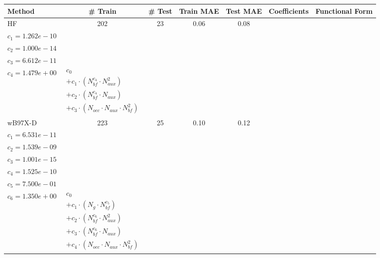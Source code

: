 \small
\setlength{\tabcolsep}{3pt}
\begin{longtable}{|l|c|c|c|c|p{3.2cm}|p{5.0cm}|}
\hline
\textbf{Method} & \textbf{\# Train} & \textbf{\# Test} & \textbf{Train MAE} & \textbf{Test MAE} & \textbf{Coefficients} & \textbf{Functional Form} \\ 
\hline
\endhead
HF & 202 & 23 & 0.06 & 0.08 & \begin{tabular}{l}\(c_{0}=3.037e+00\) \\ \(c_{1}=1.262e-10\) \\ \(c_{2}=1.000e-14\) \\ \(c_{3}=6.612e-11\) \\ \(c_{4}=1.479e+00\)\end{tabular} & $\begin{array}{l}c_{0} \\ + c_{1}  \cdot  (N_{bf} ^{c_{4}}  \cdot  N_{aux} ^{2}) \\ + c_{2}  \cdot  (N_{bf} ^{c_{4}}  \cdot  N_{aux}) \\ + c_{3}  \cdot  (N_{occ}  \cdot  N_{aux}  \cdot  N_{bf} ^{2})\end{array}$ \\ 
\hline
wB97X-D & 223 & 25 & 0.10 & 0.12 & \begin{tabular}{l}\(c_{0}=1.176e+01\) \\ \(c_{1}=6.531e-11\) \\ \(c_{2}=1.539e-09\) \\ \(c_{3}=1.001e-15\) \\ \(c_{4}=1.525e-10\) \\ \(c_{5}=7.500e-01\) \\ \(c_{6}=1.350e+00\)\end{tabular} & $\begin{array}{l}c_{0} \\ + c_{1}  \cdot  (N_{g}  \cdot  N_{bf} ^{c_{5}}) \\ + c_{2}  \cdot  (N_{bf} ^{c_{6}}  \cdot  N_{aux}^{2}) \\ + c_{3}  \cdot  (N_{bf} ^{c_{6}}  \cdot  N_{aux}) \\ + c_{4}  \cdot  (N_{occ}  \cdot  N_{aux}  \cdot  N_{bf} ^{2})\end{array}$ \\ 
\hline

\end{longtable}
